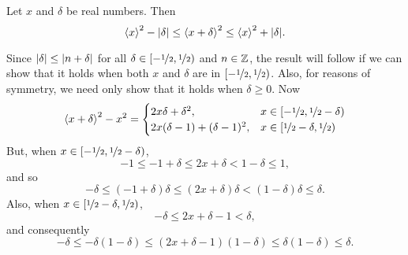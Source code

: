 \documentclass[journal]{IEEEtran}
\begin{document}
\begin{lemma}\label{lem:boundedsquarefracparts}
Let $x$ and $\delta$ be real numbers.  Then
\[
\left\langle x \right\rangle^2 - |\delta| \leq \left\langle x + \delta \right\rangle^2 \leq \left\langle x \right\rangle^2 + |\delta|.
\]
\end{lemma}
\begin{IEEEproof}
Since $\left\vert \delta \right\vert \leq \left\vert n + \delta \right\vert$ for all $\delta \in [-\nicefrac{1}{2}, \nicefrac{1}{2})$ and $n \in {\mathbb Z}$, the result will follow if we can show that it holds when both $x$ and $\delta$ are in $[-\nicefrac{1}{2}, \nicefrac{1}{2})$.  Also, for reasons of symmetry, we need only show that it holds when $\delta \geq 0$.  Now
\[
\left\langle x + \delta \right\rangle^2 - x^2 = \begin{cases}
2x\delta + \delta^2, & x \in [-\nicefrac{1}{2}, \nicefrac{1}{2} - \delta) \\
2x(\delta-1) + (\delta-1)^2, & x \in [\nicefrac{1}{2} - \delta, \nicefrac{1}{2})
\end{cases}
\] 
But, when $x \in [-\nicefrac{1}{2}, \nicefrac{1}{2} - \delta)$, 
\[
-1 \leq -1 + \delta \leq 2x + \delta < 1 - \delta \leq 1,
\]
and so
\[
-\delta \leq (-1 + \delta)\delta \leq (2x + \delta)\delta < (1-\delta)\delta \leq \delta.
\]
Also, when $x \in [\nicefrac{1}{2} - \delta, \nicefrac{1}{2})$,
\[
-\delta \leq 2x + \delta - 1 < \delta,
\]
and consequently
\[
-\delta \leq -\delta(1-\delta) \leq (2x + \delta - 1)(1 - \delta) \leq \delta(1 - \delta) \leq \delta.
\]


\end{IEEEproof}
\end{document}
